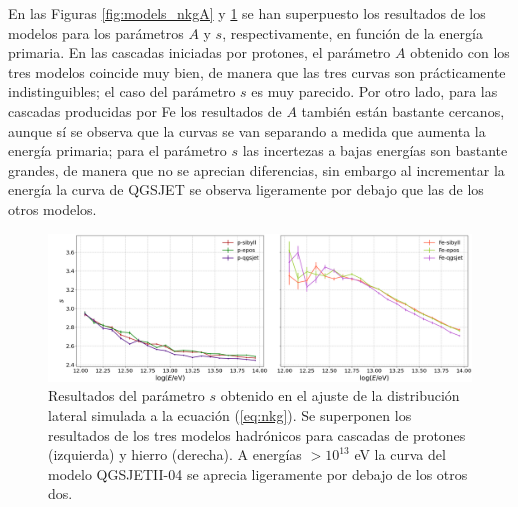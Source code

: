 \documentclass[12pt,letterpaper]{report}
\begin{document}
	En las Figuras \ref{fig:models_nkgA} y \ref{fig:models_nkgs} se han superpuesto los resultados de los modelos para los par\'ametros $A$ y $s$, respectivamente,  en funci\'on de la energ\'ia primaria. En las cascadas iniciadas por protones, el par\'ametro $A$ obtenido con los tres modelos coincide muy bien, de manera que las tres curvas son pr\'acticamente indistinguibles; el caso del par\'ametro $s$ es muy parecido. Por otro lado, para las cascadas producidas por Fe los resultados de $A$ tambi\'en est\'an bastante cercanos, aunque s\'i se observa que la curvas se van separando a medida que aumenta la energ\'ia primaria; para el par\'ametro $s$ las incertezas a bajas energ\'ias son bastante grandes, de manera que no se aprecian diferencias, sin embargo al incrementar la energ\'ia la curva de QGSJET se observa ligeramente por debajo que las de los otros modelos. \\
		\begin{figure} []
		\includegraphics[width=\textwidth]{Figuras/models_nkgs}
		\caption{Resultados del par\'ametro $s$ obtenido en el ajuste de la distribuci\'on lateral simulada a la ecuaci\'on (\ref{eq:nkg}). Se superponen los resultados de los tres modelos hadr\'onicos para cascadas de protones (izquierda) y hierro (derecha). A energ\'ias $>10^{13}$ eV la curva del modelo QGSJETII-04 se aprecia ligeramente por debajo de los otros dos.}  
		\label{fig:models_nkgs}
		\end{figure}	
		
\end{document}
